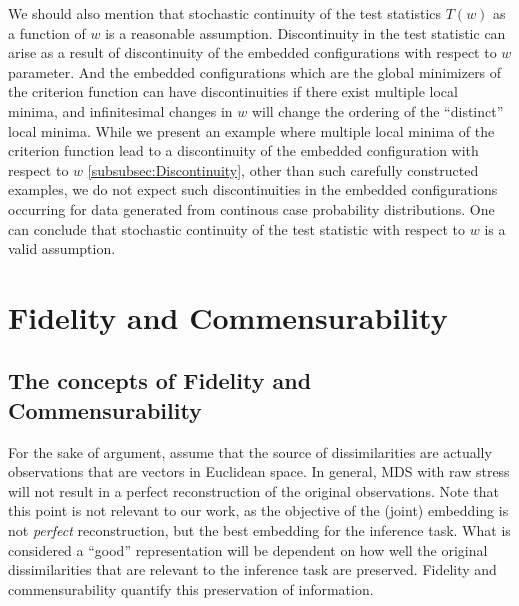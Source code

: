 \documentclass[12pt,oneside,final]{thesis}\usepackage[]{graphicx}\usepackage[]{color}
\begin{document}
We should also mention that stochastic continuity of the test statistics $T(w)$ as a function of $w$  is a reasonable assumption. Discontinuity in the test statistic can arise as  a result of discontinuity of the embedded configurations with respect to $w$ parameter. And the embedded configurations which are the global minimizers of the criterion function can have discontinuities if  there exist multiple local minima, and  infinitesimal changes in $w$ will change the ordering of the ``distinct'' local minima. While  we present an example where multiple local minima of the criterion function  lead to  a discontinuity of the embedded configuration  with respect to $w$ \ref{subsubsec:Discontinuity}, other than such carefully constructed examples, we do not expect  such discontinuities in the embedded configurations occurring for data generated from continous case probability distributions. 
One can conclude  that stochastic continuity of the test statistic with respect to $w$  is a valid assumption.




\chapter{Fidelity and Commensurability}
\label{chap:FidComm}

\section{The concepts of  Fidelity and Commensurability\label{chap:FidComm}}

For the sake of argument, assume that the source of dissimilarities  are actually observations that are vectors in  Euclidean space. In general, MDS with raw stress will not result in a perfect reconstruction  of the original observations.
 Note that this point is not relevant to our work, as   the objective of the (joint) embedding is not \emph{perfect} reconstruction, but the best embedding for the inference task. What is considered a ``good''  representation will be dependent on how well the original dissimilarities that are relevant to the inference task are preserved. Fidelity and commensurability quantify this preservation of information.
\end{document}
